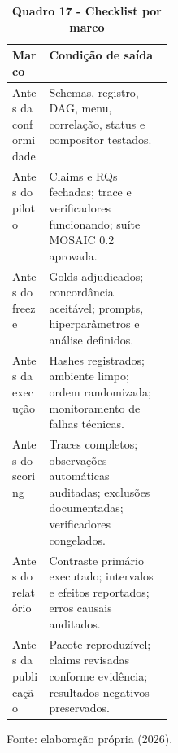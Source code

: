 \begin{table}[H]
\centering
\caption*{\textbf{Quadro 17 - Checklist por marco}}
\footnotesize
\renewcommand{\arraystretch}{1.14}
\begin{tabularx}{\linewidth}{|p{0.23\linewidth}|Y|}
\hline
\textbf{Marco} & \textbf{Condição de saída} \\
\hline
Antes da conformidade & Schemas, registro, DAG, menu, correlação, status e compositor testados. \\
\hline
Antes do piloto & Claims e RQs fechadas; trace e verificadores funcionando;
suíte MOSAIC 0.2 aprovada. \\
\hline
Antes do freeze & Golds adjudicados; concordância aceitável; prompts,
hiperparâmetros e análise definidos. \\
\hline
Antes da execução & Hashes registrados; ambiente limpo; ordem randomizada;
monitoramento de falhas técnicas. \\
\hline
Antes do scoring & Traces completos; observações automáticas auditadas;
exclusões documentadas; verificadores congelados. \\
\hline
Antes do relatório & Contraste primário executado; intervalos e efeitos
reportados; erros causais auditados. \\
\hline
Antes da publicação & Pacote reproduzível; claims revisadas conforme evidência;
resultados negativos preservados. \\
\hline
\end{tabularx}
\par\smallskip\raggedright\small Fonte: elaboração própria (2026).
\end{table}
